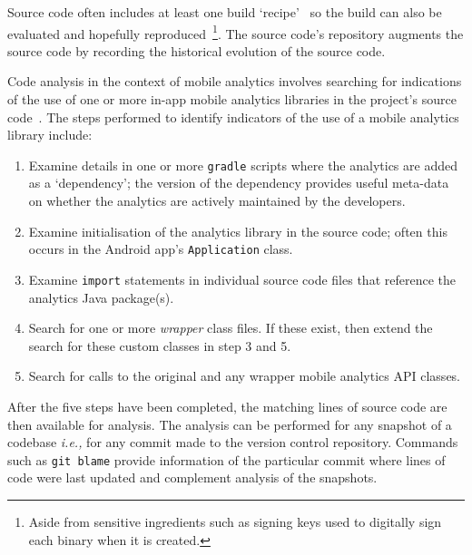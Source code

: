 Source code often includes at least one build `recipe'~ so the build can also be evaluated and hopefully reproduced~\footnote{Aside from sensitive ingredients such as signing keys used to digitally sign each binary when it is created.}. The source code's repository augments the source code by recording the historical evolution of the source code.

Code analysis in the context of mobile analytics involves searching for indications of the use of one or more in-app mobile analytics libraries in the project's source code~. The steps performed to identify indicators %
of the use of a mobile analytics library include:

\begin{enumerate}
    \itemsep 0em
    \item Examine details in one or more \texttt{gradle} scripts where the analytics are added as a `dependency'; the version of the dependency provides useful meta-data on whether the analytics are actively maintained by the developers. %
    \item Examine initialisation of the analytics library in the source code; often this occurs in the Android app's \texttt{Application} class. %
    \item Examine \texttt{import} statements in individual source code files that reference the analytics Java package(s).
    \item Search for one or more \textit{wrapper} class files. If these exist, then extend the search for these custom classes in step 3 and 5.
    \item Search for calls to the original and any wrapper mobile analytics API classes. %
\end{enumerate}

After the five steps have been completed, the matching lines of source code are then available for analysis. 
%
The analysis can be performed for any snapshot of a codebase \textit{i.e.,} for any commit made to the version control repository. Commands such as \texttt{git blame} provide information of the particular commit where lines of code were last updated and complement analysis of the snapshots.


